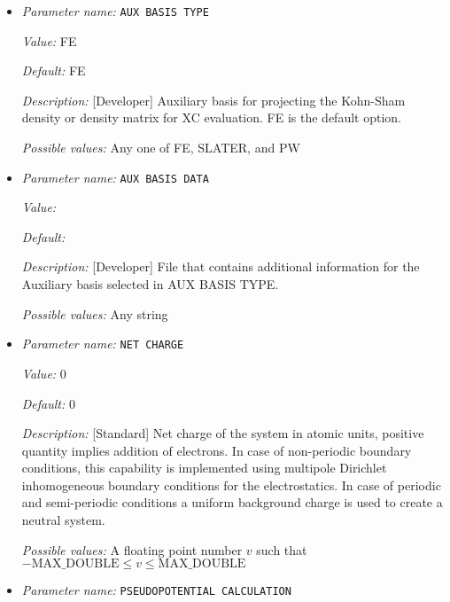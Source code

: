 \begin{itemize}
{\it Possible values:} Any string
\item {\it Parameter name:} {\tt AUX BASIS TYPE}
\label{parameters:DFT functional parameters/AUX BASIS TYPE}
\label{parameters:DFT_20functional_20parameters/AUX_20BASIS_20TYPE}


{\it Value:} FE


{\it Default:} FE


{\it Description:} [Developer] Auxiliary basis for projecting the Kohn-Sham density or density matrix for XC evaluation. FE is the default option.


{\it Possible values:} Any one of FE, SLATER, and PW
\item {\it Parameter name:} {\tt AUX BASIS DATA}
\label{parameters:DFT functional parameters/AUX BASIS DATA}
\label{parameters:DFT_20functional_20parameters/AUX_20BASIS_20DATA}


{\it Value:} 


{\it Default:} 


{\it Description:} [Developer] File that contains additional information for the Auxiliary basis selected in AUX BASIS TYPE.

{\it Possible values:} Any string
\item {\it Parameter name:} {\tt NET CHARGE}
\label{parameters:DFT functional parameters/NET CHARGE}
\label{parameters:DFT_20functional_20parameters/NET_20CHARGE}


{\it Value:} 0


{\it Default:} 0


{\it Description:} [Standard] Net charge of the system in atomic units, positive quantity implies addition of electrons. In case of non-periodic boundary conditions, this capability is implemented using multipole Dirichlet inhomogeneous boundary conditions for the electrostatics. In case of periodic and semi-periodic conditions a uniform background charge is used to create a neutral system.


{\it Possible values:}  A floating point number $v$ such that $-\text{MAX\_DOUBLE} \leq v \leq \text{MAX\_DOUBLE}$
\item {\it Parameter name:} {\tt PSEUDOPOTENTIAL CALCULATION}
\label{parameters:DFT functional parameters/PSEUDOPOTENTIAL CALCULATION}
\label{parameters:DFT_20functional_20parameters/PSEUDOPOTENTIAL_20CALCULATION}



\end{itemize}
